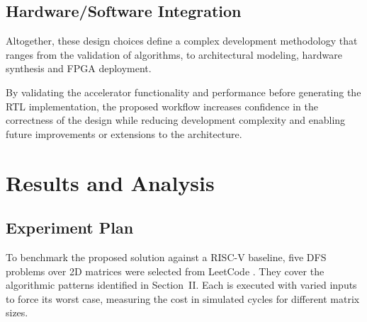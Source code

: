 \documentclass[conference]{IEEEtran}
\begin{document}
\subsection{Hardware/Software Integration}

Altogether, these design choices define a complex development methodology that ranges from the validation of algorithms, to architectural modeling, hardware synthesis and FPGA deployment.

By validating the accelerator functionality and performance before generating the RTL implementation, the proposed workflow increases confidence in the correctness of the design while reducing development complexity and enabling future improvements or extensions to the architecture.

\section{Results and Analysis}

\subsection{Experiment Plan}

To benchmark the proposed solution against a RISC-V baseline, five DFS problems
over 2D matrices were selected from LeetCode \cite{leetcode}. They cover the
algorithmic patterns identified in Section~II. Each is executed with varied
inputs to force its worst case, measuring the cost in simulated cycles for
different matrix sizes.
\end{document}
